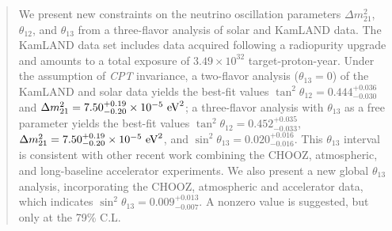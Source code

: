 \documentclass[aps,prc,twocolumn,groupedaddress,showpacs,amsmath,amssymb,floatfix,superscriptaddress]{revtex4}
\begin{document}
\begin{abstract}

We present new constraints on the neutrino oscillation parameters $\Delta m^{2}_{21}$, $\theta_{12}$, and $\theta_{13}$ from a three-flavor analysis of solar and KamLAND data. The KamLAND data set includes data acquired following a radiopurity upgrade and amounts to a total exposure of  $3.49 \times 10^{32}$ target-proton-year.  Under the assumption of {\it CPT} invariance, a two-flavor analysis (\mbox{$\theta_{13} = 0$}) of the KamLAND and solar data yields the best-fit values $\tan^{2} \theta_{12} = 0.444^{+0.036}_{-0.030}$ and $\Delta m^{2}_{21} = 7.50^{+0.19}_{-0.20} \times 10^{-5} ~ {\rm eV}^{2}$; a three-flavor analysis with $\theta_{13}$ as a free parameter yields the best-fit values $\tan^{2} \theta_{12} = 0.452^{+0.035}_{-0.033}$, $\Delta m^{2}_{21} = 7.50^{+0.19}_{-0.20} \times 10^{-5} ~ {\rm eV}^{2}$, and $\sin^{2} \theta_{13} = 0.020^{+0.016}_{-0.016}$. This $\theta_{13}$ interval is consistent with other recent work combining the CHOOZ, atmospheric, and long-baseline accelerator experiments.  We also present a new global $\theta_{13}$ analysis, incorporating the CHOOZ, atmospheric and accelerator data, which indicates $\sin^{2} \theta_{13} = 0.009^{+0.013}_{-0.007}$.
A nonzero value is suggested, but only at the 79\% C.L.

\end{abstract}


\maketitle
\end{document}

